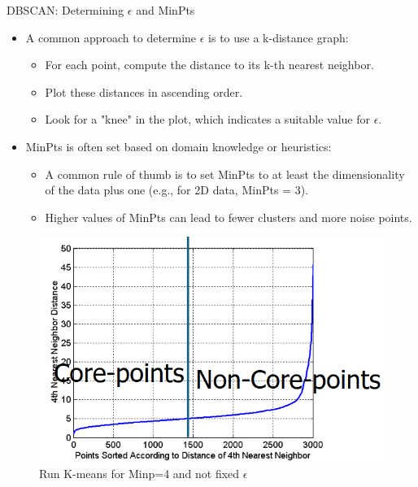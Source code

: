 \begin{frame}[allowframebreaks]{DBSCAN: Determining $\epsilon$ and MinPts}
\begin{itemize}
    \item A common approach to determine $\epsilon$ is to use a k-distance graph:
    \begin{itemize}
        \item For each point, compute the distance to its k-th nearest neighbor.
        \item Plot these distances in ascending order.
        \item Look for a "knee" in the plot, which indicates a suitable value for $\epsilon$.
    \end{itemize}
    \item MinPts is often set based on domain knowledge or heuristics:
    \begin{itemize}
        \item A common rule of thumb is to set MinPts to at least the dimensionality of the data plus one (e.g., for 2D data, MinPts = 3).
        \item Higher values of MinPts can lead to fewer clusters and more noise points.
    \end{itemize}
\end{itemize}

\begin{figure}
    \centering
    \includegraphics[height=0.8\textheight,keepaspectratio]{images/dul/dbscan/eps-determination.png}
    \caption{Run K-means for Minp=4 and not fixed $\epsilon$}
\end{figure}
\end{frame}


